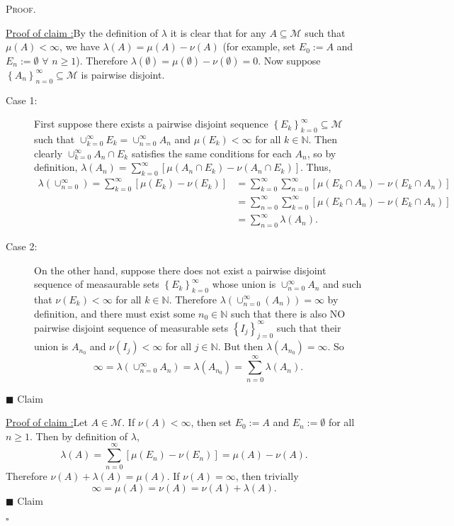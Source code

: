 \documentclass[12pt]{article}
\newcounter{ProofCounter}
\newcounter{ClaimCounter}[ProofCounter]
\newenvironment{Proof}{\stepcounter{ProofCounter}\textsc{Proof.}}{\hfill$\square$}
\newenvironment{claim}[1]{\vspace{1mm}\stepcounter{ClaimCounter}\par\noindent\underline{\bf Claim \theClaimCounter:}\space#1}{}
\newenvironment{claimproof}[1]{\par\noindent\underline{Proof of claim \theClaimCounter:}\space#1}{\hfill $\blacksquare$ Claim \theClaimCounter}
\begin{document}
\begin{Proof}
\begin{claimproof}
By the definition of $\lambda$ it is clear that for any $A \subseteq \mathcal{M}$ such that $\mu(A) < \infty$, we have $\lambda(A) = \mu(A) - \nu(A)$ 
(for example, set $E_{0} := A$ and $E_{n} := \emptyset$ $\forall$ $n \geq 1$).
Therefore $\lambda(\emptyset) = \mu(\emptyset) - \nu(\emptyset) = 0$. Now suppose $\left\{ A_{n} \right\}_{n=0}^{\infty} \subseteq \mathcal{M}$ is
pairwise disjoint.
\begin{description}
\item[Case 1:] First suppose there exists a pairwise disjoint sequence $\left\{ E_{k} \right\}_{k=0}^{\infty} \subseteq \mathcal{M}$ such that
$\cup_{k=0}^{\infty}E_{k} = \cup_{n=0}^{\infty}A_{n}$ and $\mu(E_{k}) < \infty$ for all $k \in \mathbb{N}$. Then clearly $\cup_{k=0}^{\infty}A_{n}\cap
E_{k}$ satisfies the same conditions for each $A_{n}$, so by definition, $\lambda(A_{n}) = \sum_{k=0}^{\infty}[\mu(A_{n}\cap E_{k}) - \nu(A_{n}\cap
E_{k})]$. Thus,
\begin{align*}
\lambda\left( \cup_{n=0}^{\infty} \right) = \sum_{k=0}^{\infty}[\mu(E_{k}) - \nu(E_{k})] & = \sum_{k=0}^{\infty}
\sum_{n=0}^{\infty}\left[\mu(E_{k}\cap A_{n}) - \nu(E_{k} \cap A_{n}) \right] \\
& = \sum_{n=0}^{\infty}\sum_{k=0}^{\infty}\left[ \mu(E_{k}\cap A_{n}) - \nu(E_{k} \cap A_{n}) \right] \\
& = \sum_{n=0}^{\infty}\lambda(A_{n}).
\end{align*}
\item[Case 2:] On the other hand, suppose there does not exist a pairwise disjoint sequence of measaurable sets $\left\{ E_{k}
\right\}_{k=0}^{\infty}$ whose union is $\cup_{n=0}^{\infty}A_{n}$ and such that $\nu(E_{k}) < \infty$ for all $k \in \mathbb{N}$. Therefore
$\lambda\left( \cup_{n=0}^{\infty}(A_{n}) \right) = \infty$ by definition, and there must exist some $n_{0} \in \mathbb{N}$ such that there is also NO
pairwise disjoint sequence of measurable sets $\left\{ I_{j} \right\}_{j=0}^{\infty}$ such that their union is $A_{n_{0}}$ and $\nu(I_{j}) < \infty$ for all $j \in
\mathbb{N}$. But then $\lambda(A_{n_0}) = \infty$. So 
\[ \infty = \lambda\left( \cup_{n=0}^{\infty}A_{n} \right) = \lambda(A_{n_0}) = \sum_{n=0}^{\infty}\lambda(A_{n}). \]
\end{description}
\end{claimproof}

\begin{claimproof}
Let $A \in \mathcal{M}$. If $\nu(A) < \infty$, then set $E_{0} := A$ and $E_{n} := \emptyset$ for all $n\geq 1$. Then by definition of $\lambda$,
\[ \lambda(A) = \sum_{n=0}^{\infty}[\mu(E_{n}) - \nu(E_{n})] = \mu(A) - \nu(A). \]
Therefore $\nu(A) + \lambda(A) = \mu(A)$. If $\nu(A) = \infty$, then trivially
\[ \infty = \mu(A) = \nu(A) = \nu(A) + \lambda(A). \]
\end{claimproof}

\end{Proof}
\end{document}
